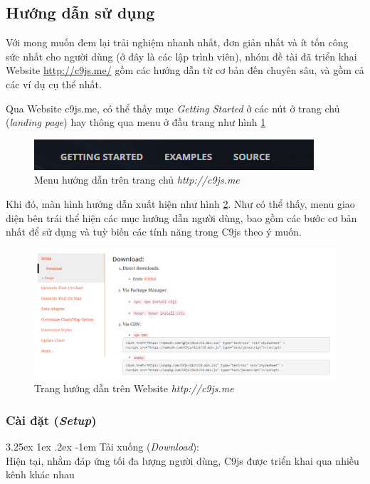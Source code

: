 \documentclass[12pt,a4paper,twoside]{article}
\makeatletter
\newcommand{\myparagraph}[1]{\paragraph{#1}\mbox{}\\} %
\renewcommand\paragraph{\@startsection{paragraph}{5}{\z@}%
  {3.25ex \@plus1ex \@minus.2ex}%
  {-1em}%
  {\normalfont\normalsize\bfseries}}
\makeatother
\begin{document}
\subsection{Hướng dẫn sử dụng}
Với mong muốn đem lại trải nghiệm nhanh nhất, đơn giản nhất và ít tốn công sức nhất cho người dùng (ở đây là các lập trình viên), nhóm đề tài đã triển khai Website \url{http://c9js.me/} gồm các hướng dẫn từ cơ bản đến chuyên sâu, và gồm cả các ví dụ cụ thể nhất. 

Qua Website c9js.me, có thể thấy mục \textit{Getting Started} ở các nút ở trang chủ (\textit{landing page}) hay thông qua menu ở đầu trang như hình \ref{fig:getting_started}

\begin{figure}[!h]
	\begin{center}
    \includegraphics[scale=.8]{image/getting_started}
    \caption{Menu hướng dẫn trên trang chủ \textit{http://c9js.me}}
    \label{fig:getting_started}
	\end{center}
\end{figure}

Khi đó, màn hình hướng dẫn xuất hiện như hình \ref{fig:gs_1}. Như có thể thấy, menu giao diện bên trái thể hiện các mục hướng dẫn người dùng, bao gồm các bước cơ bản nhất để sử dụng và tuỳ biến các tính năng trong C9js theo ý muốn.
\begin{figure}[!h]
	\begin{center}
    \includegraphics[scale=.5]{image/gs_1}
    \caption{Trang hướng dẫn trên Website \textit{http://c9js.me}}
    \label{fig:gs_1}
	\end{center}
\end{figure}

\subsubsection{Cài đặt (\textit{Setup})}
\myparagraph{Tải xuống (\textit{Download}):}
Hiện tại, nhằm đáp ứng tối đa lượng người dùng, C9js được triển khai qua nhiều kênh khác nhau
\end{document}

